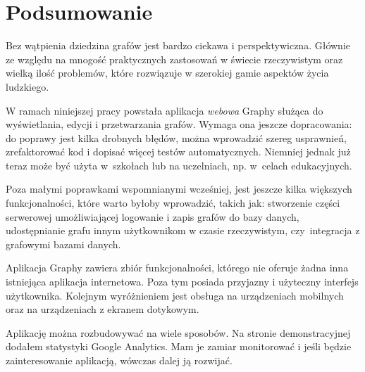 \chapter{Podsumowanie}

Bez wątpienia dziedzina grafów jest bardzo ciekawa i perspektywiczna. Głównie ze względu na mnogość praktycznych zastosowań w świecie rzeczywistym oraz wielką ilość problemów, które rozwiązuje w szerokiej gamie aspektów życia ludzkiego. 

W ramach niniejszej pracy powstała aplikacja \textit{webowa} Graphy służąca do wyświetlania, edycji i przetwarzania grafów. Wymaga ona jeszcze dopracowania: do poprawy jest kilka drobnych błędów, można wprowadzić szereg usprawnień, zrefaktorować kod i dopisać więcej testów automatycznych. Niemniej jednak już teraz może być użyta w~szkołach lub na uczelniach, np. w~celach edukacyjnych. 

Poza małymi poprawkami wspomnianymi wcześniej, jest jeszcze kilka większych funkcjonalności, które warto byłoby wprowadzić, takich jak: stworzenie części serwerowej umożliwiającej logowanie i zapis grafów do bazy danych, udostępnianie grafu innym użytkownikom w czasie rzeczywistym, czy~integracja z grafowymi bazami danych.

Aplikacja Graphy zawiera zbiór funkcjonalności, którego nie oferuje żadna inna istniejąca aplikacja internetowa. Poza tym posiada przyjazny i użyteczny interfejs użytkownika. Kolejnym wyróżnieniem jest obsługa na urządzeniach mobilnych oraz na urządzeniach z ekranem dotykowym. 

Aplikację można rozbudowywać na wiele sposobów. Na stronie demonstracyjnej dodałem statystyki Google Analytics. Mam je zamiar monitorować i jeśli będzie zainteresowanie aplikacją, wówczas dalej ją rozwijać.
